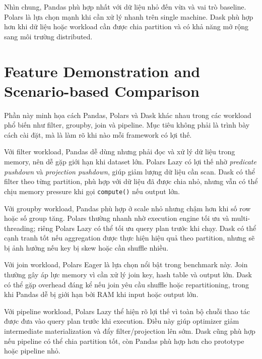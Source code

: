 \documentclass[12pt,a4paper]{article}
\begin{document}
Nhìn chung, Pandas phù hợp nhất với dữ liệu nhỏ đến vừa và vai trò baseline. Polars là lựa chọn mạnh khi cần xử lý nhanh trên single machine. Dask phù hợp hơn khi dữ liệu hoặc workload cần được chia partition và có khả năng mở rộng sang môi trường distributed.
\section{Feature Demonstration and Scenario-based Comparison}

Phần này minh họa cách Pandas, Polars và Dask khác nhau trong các workload phổ biến như filter, groupby, join và pipeline. Mục tiêu không phải là trình bày cách cài đặt, mà là làm rõ khi nào mỗi framework có lợi thế.

Với filter workload, Pandas dễ dùng nhưng phải đọc và xử lý dữ liệu trong memory, nên dễ gặp giới hạn khi dataset lớn. Polars Lazy có lợi thế nhờ \textit{predicate pushdown} và \textit{projection pushdown}, giúp giảm lượng dữ liệu cần scan. Dask có thể filter theo từng partition, phù hợp với dữ liệu đã được chia nhỏ, nhưng vẫn có thể chịu memory pressure khi gọi \texttt{compute()} nếu output lớn.

Với groupby workload, Pandas phù hợp ở scale nhỏ nhưng chậm hơn khi số row hoặc số group tăng. Polars thường nhanh nhờ execution engine tối ưu và multi-threading; riêng Polars Lazy có thể tối ưu query plan trước khi chạy. Dask có thể cạnh tranh tốt nếu aggregation được thực hiện hiệu quả theo partition, nhưng sẽ bị ảnh hưởng nếu key bị skew hoặc cần shuffle nhiều.

Với join workload, Polars Eager là lựa chọn nổi bật trong benchmark này. Join thường gây áp lực memory vì cần xử lý join key, hash table và output lớn. Dask có thể gặp overhead đáng kể nếu join yêu cầu shuffle hoặc repartitioning, trong khi Pandas dễ bị giới hạn bởi RAM khi input hoặc output lớn.

Với pipeline workload, Polars Lazy thể hiện rõ lợi thế vì toàn bộ chuỗi thao tác được đưa vào query plan trước khi execution. Điều này giúp optimizer giảm intermediate materialization và đẩy filter/projection lên sớm. Dask cũng phù hợp nếu pipeline có thể chia partition tốt, còn Pandas phù hợp hơn cho prototype hoặc pipeline nhỏ.
\end{document}
